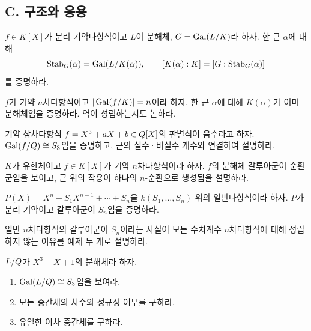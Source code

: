\subsection*{C. 구조와 응용}

\begin{exercise}[*]
$f\in K[X]$가 분리 기약다항식이고 $L$이 분해체, $G=\operatorname{Gal}(L/K)$라 하자. 한 근 $\alpha$에 대해
\[
  \operatorname{Stab}_G(\alpha)=\operatorname{Gal}(L/K(\alpha)),
  \qquad
  [K(\alpha):K]=[G:\operatorname{Stab}_G(\alpha)]
\]
를 증명하라.
\end{exercise}

\begin{exercise}
$f$가 기약 $n$차다항식이고 $|\operatorname{Gal}(f/K)|=n$이라 하자. 한 근 $\alpha$에 대해 $K(\alpha)$가 이미 분해체임을 증명하라. 역이 성립하는지도 논하라.
\end{exercise}

\begin{exercise}[*]
기약 삼차다항식 $f=X^3+aX+b\in Q[X]$의 판별식이 음수라고 하자. $\operatorname{Gal}(f/Q)\cong S_3$임을 증명하고, 근의 실수·비실수 개수와 연결하여 설명하라.
\end{exercise}

\begin{exercise}
$K$가 유한체이고 $f\in K[X]$가 기약 $n$차다항식이라 하자. $f$의 분해체 갈루아군이 순환군임을 보이고, 근 위의 작용이 하나의 $n$-순환으로 생성됨을 설명하라.
\end{exercise}

\begin{exercise}[*]
$P(X)=X^n+S_1X^{n-1}+\cdots+S_n$을 $k(S_1,\dots,S_n)$ 위의 일반다항식이라 하자. $P$가 분리 기약이고 갈루아군이 $S_n$임을 증명하라.
\end{exercise}

\begin{exercise}
일반 $n$차다항식의 갈루아군이 $S_n$이라는 사실이 모든 수치계수 $n$차다항식에 대해 성립하지 않는 이유를 예제 두 개로 설명하라.
\end{exercise}

\begin{exercise}[*]
$L/Q$가 $X^3-X+1$의 분해체라 하자.
\begin{enumerate}[label=(\alph*)]
  \item $\operatorname{Gal}(L/Q)\cong S_3$임을 보여라.
  \item 모든 중간체의 차수와 정규성 여부를 구하라.
  \item 유일한 이차 중간체를 구하라.
\end{enumerate}
\end{exercise}

